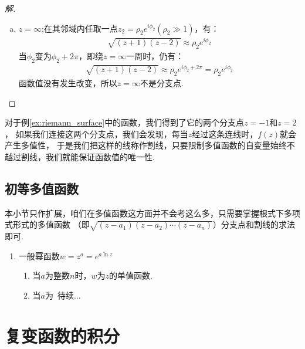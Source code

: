 \documentclass[12pt, a4paper]{ctexbook}
\begin{document}
\begin{proof}[解]
\begin{enumerate}[(a)]
                        \item $z = \infty$;在其邻域内任取一点$z_2 = \rho_2 e^{i \phi_2}(\rho_2 \gg 1)$，有：
                            \begin{align*}
                                \sqrt{(z + 1)(z - 2)} \approx \rho_2 e^{i\phi_2}
                            \end{align*}
                            当$\phi_2$变为$\phi_2 + 2\pi$，即绕$z = \infty$一周时，仍有：
                            \begin{align*}
                                \sqrt{(z + 1)(z - 2)} \approx \rho_2 e^{i\phi_2 + 2\pi}
                                = \rho_2 e^{i\phi_2}
                            \end{align*}
                            函数值没有发生改变，所以$z = \infty$不是分支点.
                    \end{enumerate}
                \end{proof}

                对于例\ref{ex:riemann_surface}中的函数，我们得到了它的两个分支点$z = -1$和$z = 2$，
                如果我们连接这两个分支点，我们会发现，每当$z$经过这条连线时，$f(z)$就会产生多值性，
                于是我们把这样的线称作割线，只要限制多值函数的自变量始终不越过割线，我们就能保证函数值的唯一性.
                

            \subsection{初等多值函数}
                本小节只作扩展，咱们在多值函数这方面并不会考这么多，只需要掌握根式下多项式形式的多值函数
                （即$\sqrt{(z - a_1)(z - a_2)\cdots(z - a_n)}$）分支点和割线的求法即可.

                \begin{enumerate}
                    \item 一般幂函数$w = z^a = e^{a \ln{z}}$
                        \begin{enumerate}[(1)]
                            \item 当$a$为整数$n$时，$w$为$z$的单值函数.
                            \item 当$a$为\ 待续... %
                        \end{enumerate}
                \end{enumerate}

        \section{复变函数的积分}
\end{document}
